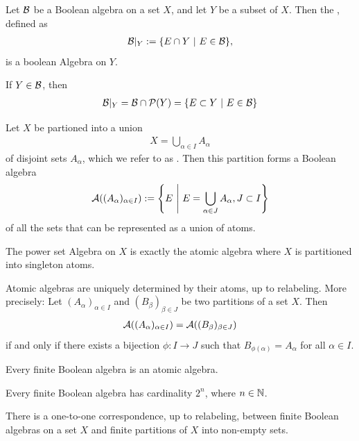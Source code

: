 \begin{theorem}
	Let $\mathcal{B}$ be a Boolean algebra on a set $X$, and let $Y$ be a subset of $X$. Then the , defined as
	\begin{align*}
		\mathcal{B}|_Y := \qty{E \cap Y ~\middle|~E \in \mathcal{B}},
	\end{align*}
	is a boolean Algebra on $Y$.
\end{theorem}
\begin{theorem}
	If $Y \in \mathcal{B}$, then
	\begin{align*}
		\mathcal{B}|_Y = \mathcal{B} \cap \mathcal{P}(Y) = \qty{E \subset Y ~\middle|~E \in \mathcal{B}}
	\end{align*}
\end{theorem}
\begin{theorem}
	 Let $X$ be partioned into a union
	\begin{align*}
		X = \bigcup_{\alpha \in I} A_\alpha
	\end{align*}
	of disjoint sets $A_\alpha$, which we refer to as . Then this partition forms a Boolean algebra 
	\begin{align*}
		\mathcal{A}((A_\alpha)_{\alpha \in I}) 
		:= \qty{ E ~\middle|~E = \bigcup_{\alpha \in J} A_\alpha, J \subset I}
	\end{align*}
	of all the sets that can be represented as a union of atoms.
\end{theorem}
The power set Algebra on $X$ is exactly the atomic algebra where $X$ is partitioned into singleton atoms.
\begin{theorem}
	Atomic algebras are uniquely determined by their atoms, up to relabeling. More precisely:
	Let $(A_\alpha)_{\alpha \in I}$ and $(B_\beta)_{\beta \in J}$ be two partitions of a set $X$. Then
	\begin{align*}
		\mathcal{A}((A_\alpha)_{\alpha \in I}) 
		=
		\mathcal{A}((B_\beta)_{\beta \in J}) 
	\end{align*}
	if and only if there exists a bijection $\phi : I \to J$ such that $B_{\phi(\alpha)} = A_{\alpha}$ for all $\alpha \in I$.
\end{theorem}
\begin{theorem}
	Every finite Boolean algebra is an atomic algebra.
\end{theorem}
\begin{corollary}
	Every finite Boolean algebra has cardinality $2^n$, where $n \in \mathbb{N}$.
\end{corollary}
\begin{corollary}
	There is a one-to-one correspondence, up to relabeling, between finite Boolean algebras on a set $X$ and finite partitions of $X$ into non-empty sets.
\end{corollary}
